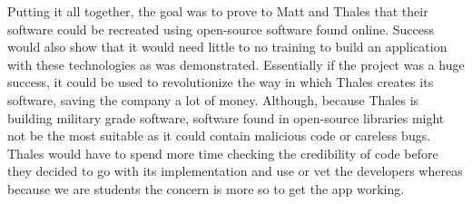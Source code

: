 \documentclass{l3proj}
\begin{document}
Putting it all together, the goal was to prove to Matt and Thales that their software could be recreated using open-source software found online.  Success would also show that it would need little to no training to build an application with these technologies as was demonstrated.  Essentially if the project was a huge success, it could be used to revolutionize the way in which Thales creates its software, saving the company a lot of money.  Although, because Thales is building military grade software, software found in open-source libraries might not be the most suitable as it could contain malicious code or careless bugs.  Thales would have to spend more time checking the credibility of code before they decided to go with its implementation and use or vet the developers whereas because we are students the concern is more so to get the app working.





\label{sec:Customer}
\end{document}
